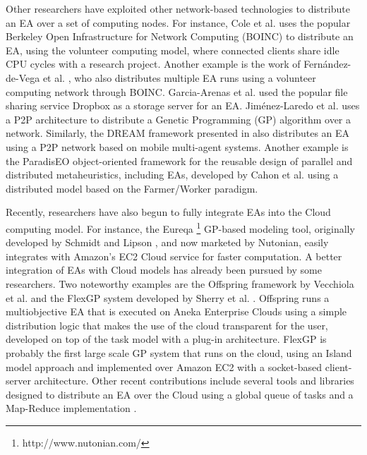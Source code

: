 Other researchers have exploited other network-based technologies to distribute an EA over a set of computing nodes.
For instance, Cole et al. \cite{MilkyWay} uses the popular Berkeley Open Infrastructure for Network Computing (BOINC) to distribute an EA,
using the volunteer computing model, where connected clients share idle CPU cycles with a research project.
Another example is the work of Fern\'andez-de-Vega et al. \cite{nc}, who also distributes multiple EA runs using a volunteer computing network through BOINC.
Garcia-Arenas et al. \cite{garcia2011} used the popular file sharing service Dropbox as a storage server for an EA.
Jim\'enez-Laredo et al. \cite{garcia2011} uses a P2P architecture to distribute a Genetic Programming (GP) algorithm over a network.
Similarly, the DREAM framework presented in \cite{DREAM} also distributes an EA using a P2P network based on mobile multi-agent systems.
Another example is the ParadisEO object-oriented framework for the reusable design of parallel and distributed metaheuristics, including EAs, developed
by Cahon et al. \cite{ParadisEO} using a distributed model based on the Farmer/Worker paradigm.

Recently, researchers have also begun to fully integrate EAs into the Cloud computing model.
For instance, the Eureqa \footnote{http://www.nutonian.com/} GP-based modeling tool, originally developed by Schmidt and Lipson \cite{free-form},
and now marketed by Nutonian, easily integrates with Amazon's EC2 Cloud service for faster computation.
A better integration of EAs with Cloud models has already been pursued by some researchers.
Two noteworthy examples are the Offspring framework by Vecchiola et al. \cite{VecchiolaCORR}
and the FlexGP system developed by Sherry et al. \cite{FlexGP}.
Offspring runs a multiobjective EA that is executed on Aneka Enterprise Clouds using a simple distribution logic that makes the use of the cloud
transparent for the user, developed on top of the task model with a plug-in architecture.
FlexGP is probably the first large scale GP system that runs on the cloud, using an Island model approach and implemented over
Amazon EC2 with a socket-based client-server architecture.
Other recent contributions include several tools and libraries designed to distribute an EA over the Cloud using a global queue of tasks and a Map-Reduce
implementation \cite{FlexGP}.


